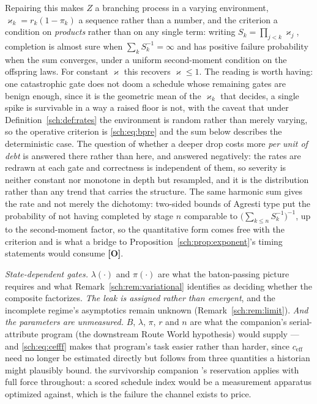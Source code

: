 Repairing this makes $Z$ a branching process in a varying environment,
$\varkappa_k=r_k(1-\pi_k)$ a sequence rather than a number, and the criterion a
condition on \emph{products} rather than on any single term: writing
$S_k=\prod_{j<k}\varkappa_j$, completion is almost sure when
$\sum_k S_k^{-1}=\infty$ and has positive failure probability when the
sum converges, under a uniform second-moment condition on the offspring
laws. For constant $\varkappa$ this recovers $\varkappa\le1$. The reading is worth
having: one catastrophic gate does not doom a schedule whose remaining
gates are benign enough, since it is the geometric mean of the $\varkappa_k$
that decides, a single spike is survivable in a way a raised floor is
not, with the caveat that under Definition~\ref{sch:def:rates} the
environment is random rather than merely varying, so the operative
criterion is \eqref{sch:eq:bpre} and the sum below describes the
deterministic case. The question of whether a deeper drop costs more
\emph{per unit of debt} is answered there rather than here, and answered
negatively: the rates are redrawn at each gate and correctness is
independent of them, so severity is neither constant nor monotone in
depth but resampled, and it is the distribution rather than any trend
that carries the structure. The same harmonic sum gives the rate and not
merely the dichotomy:
two-sided bounds of Agresti type put the probability of not having
completed by stage $n$ comparable to $\bigl(\sum_{k\le n}S_k^{-1}
\bigr)^{-1}$, up to the second-moment factor, so the quantitative form
comes free with the criterion and is what a bridge to
Proposition~\ref{sch:prop:exponent}'s timing statements would consume
\textbf{[O]}.

\emph{State-dependent gates.} $\lambda(\cdot)$ and $\pi(\cdot)$ are what
the baton-passing picture requires and what
Remark~\ref{sch:rem:variational} identifies as deciding whether the
composite factorizes. \emph{The leak is assigned rather than emergent}, and the incomplete
regime's asymptotics remain unknown (Remark~\ref{sch:rem:limit}). \emph{And the parameters are unmeasured.} $B$, $\lambda$, $\pi$, $r$ and
$n$ are what the companion's serial-attribute program
(the downstream Route World hypothesis) would supply --- and \eqref{sch:eq:cefff}
makes that program's task easier rather than harder, since
$c_{\mathrm{eff}}$ need no longer be estimated directly but follows from
three quantities a historian might plausibly bound.
the survivorship companion \cite{GoldenSurvivorship}'s reservation applies with full force
throughout: a scored schedule index would be a measurement apparatus
optimized against, which is the failure the channel exists to price.


